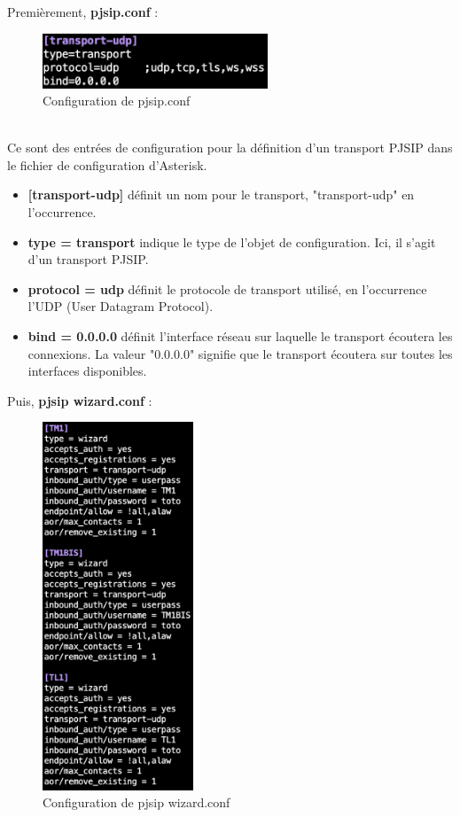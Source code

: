 \documentclass[12pt, a4paper]{article}
\begin{document}
	Premièrement, \textbf{pjsip.conf} :
	\begin{figure}[h]
		\centering
		\includegraphics[width=0.6\textwidth]{img/pjsip.png}
		\caption{Configuration de pjsip.conf}
		\label{fig:pjsip}
	\end{figure}\\
	Ce sont des entrées de configuration pour la définition d'un transport 
	PJSIP dans le fichier de configuration d'Asterisk.\\
	\begin{itemize}
		\item \textbf{[transport-udp]} définit un nom pour le transport, "transport-udp" en l'occurrence.\\
		\item \textbf{type = transport} indique le type de l'objet de configuration. Ici, il s'agit d'un transport PJSIP.\\
		\item \textbf{protocol = udp} définit le protocole de transport utilisé, en l'occurrence l'UDP (User Datagram Protocol).\\
		\item \textbf{bind = 0.0.0.0} définit l'interface réseau sur laquelle le transport écoutera les connexions. La valeur "0.0.0.0" signifie que le transport écoutera sur toutes les interfaces disponibles.\\
	\end{itemize}

	\newpage 
	

	Puis, \textbf{pjsip wizard.conf} :
	\begin{figure}[h]
		\centering
		\includegraphics[width=0.4\textwidth]{img/wizard.png}
		\caption{Configuration de pjsip wizard.conf}
		\label{fig:wiz}
	\end{figure}\\
\end{document}
